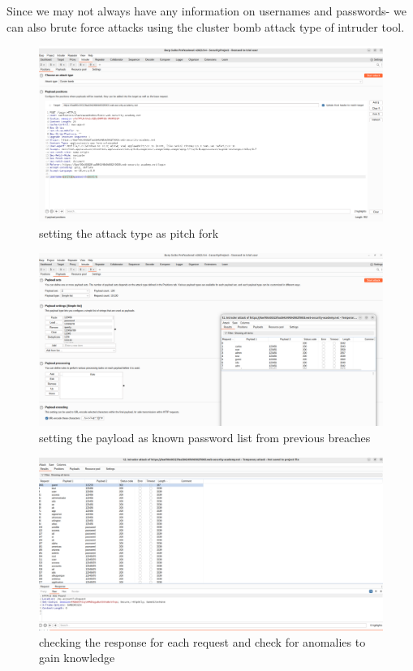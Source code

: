 \documentclass[
	a4paper, %
	12pt, %
]{CSSullivanBusinessReport}
\begin{document}
\begin{fullwidth}
    Since we may not always have any information on usernames and passwords- we can also brute force attacks using the cluster bomb attack type of intruder tool.


     \begin{figure}[H]
    \centering
    \includegraphics[width=1\textwidth]{Images/anikaScreensots/BruteForce1.png}
    \caption{setting the attack type as pitch fork}
    \label{fig:enter-label}
\end{figure}

 \begin{figure}[H]
    \centering
    \includegraphics[width=1\textwidth]{Images/anikaScreensots/bruteForce2.png}
    \caption{setting the payload as known password list from previous breaches}
    \label{fig:enter-label}
\end{figure}

 \begin{figure}[H]
    \centering
    \includegraphics[width=1\textwidth]{Images/anikaScreensots/bruteForce3.png}
    \caption{checking the response for each request and check for anomalies to gain knowledge}
    \label{fig:enter-label}
\end{figure}

\end{fullwidth}
\end{document}
